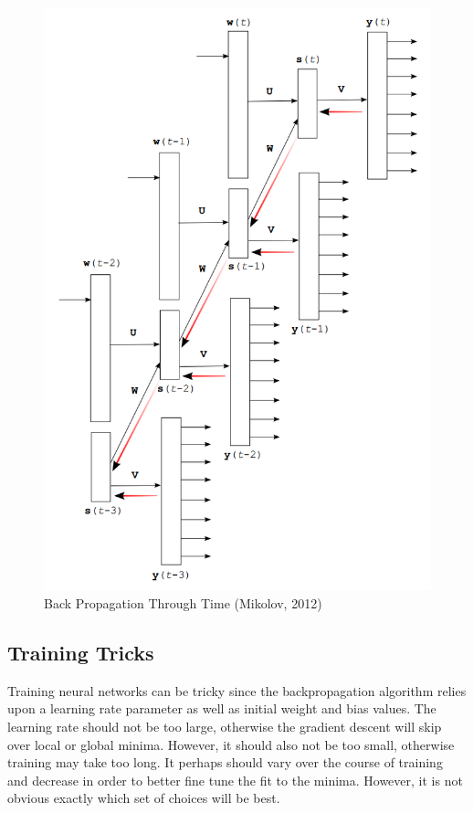 \documentclass[11pt]{article}
\begin{document}
\begin{figure}
	\includegraphics[scale=0.5]{bptt.png}
	\caption{Back Propagation Through Time (Mikolov, 2012)}\label{Bptt_fig}
\end{figure}

\subsection{Training Tricks}

Training neural networks can be tricky since the backpropagation algorithm relies upon a learning rate parameter as well as initial weight and bias values. The learning rate should not be too large, otherwise the gradient descent will skip over local or global minima. However, it should also not be too small, otherwise training may take too long. It perhaps should vary over the course of training and decrease in order to better fine tune the fit to the minima. However, it is not obvious exactly which set of choices will be best.
\end{document}

